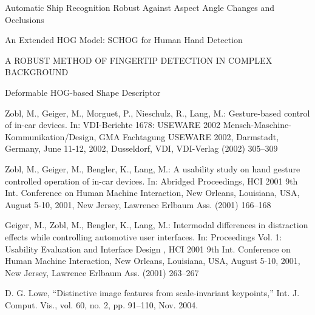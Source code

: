 \documentclass[a4paper,11pt,oneside]{book}
\begin{document}
\begin{thebibliography}{2}
 Automatic Ship Recognition Robust Against Aspect Angle Changes and Occlusions

 An Extended HOG Model: SCHOG for Human Hand Detection

 A ROBUST METHOD OF FINGERTIP DETECTION IN COMPLEX BACKGROUND

 Deformable HOG-based Shape Descriptor

 Zobl, M., Geiger, M., Morguet, P., Nieschulz, R., Lang, M.: Gesture-based control of in-car devices. In: VDI-Berichte 1678: USEWARE 2002 Mensch-Maschine-Kommunikation/Design, GMA Fachtagung USEWARE 2002, Darmstadt, Germany, June 11-12, 2002, Dusseldorf, VDI, VDI-Verlag (2002) 305–309

 Zobl, M., Geiger, M., Bengler, K., Lang, M.: A usability study on hand gesture controlled operation of in-car devices. In: Abridged Proceedings, HCI 2001 9th Int. Conference on Human Machine Interaction, New Orleans, Louisiana, USA, August 5-10, 2001, New Jersey, Lawrence Erlbaum Ass. (2001) 166–168

 Geiger, M., Zobl, M., Bengler, K., Lang, M.: Intermodal differences in distraction effects while controlling automotive user interfaces. In: Proceedings Vol. 1: Usability Evaluation and Interface Design , HCI 2001 9th Int. Conference on Human Machine Interaction, New Orleans, Louisiana, USA, August 5-10, 2001, New Jersey, Lawrence Erlbaum Ass. (2001) 263–267

 D. G. Lowe, “Distinctive image features from scale-invariant keypoints,” Int. J. Comput. Vis., vol. 60, no. 2, pp. 91–110, Nov. 2004. 


\end{thebibliography}
\end{document}
